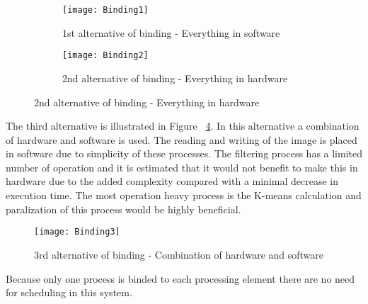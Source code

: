 \begin{figure}[H]
\centering
\begin{subfigure}{.5\textwidth}
	\centering
	\texttt{[image: Binding1]}
	\caption{1st alternative of binding - Everything in software}
	\label{fig:Binding1}
\end{subfigure}%
\begin{subfigure}{.5\textwidth}
	\centering
	\texttt{[image: Binding2]}
	\caption{2nd alternative of binding - Everything in hardware}
	\label{fig:Binding2}
\end{subfigure}%
\end{figure}

The third alternative is illustrated in Figure ~\ref{fig:Binding3}. In this alternative a combination of hardware and software is used. The reading and writing of the image is placed in software due to simplicity of these processes. The filtering process has a limited number of operation and it is estimated that it would not benefit to make this in hardware due to the added complexity compared with a minimal decrease in execution time. The most operation heavy process is the K-means calculation and paralization of this process would be highly beneficial.

\begin{figure}[H]
	\centering
	\texttt{[image: Binding3]}
	\caption{3rd alternative of binding - Combination of hardware and software}
	\label{fig:Binding3}
\end{figure}

Because only one process is binded to each processing element there are no need for scheduling in this system.